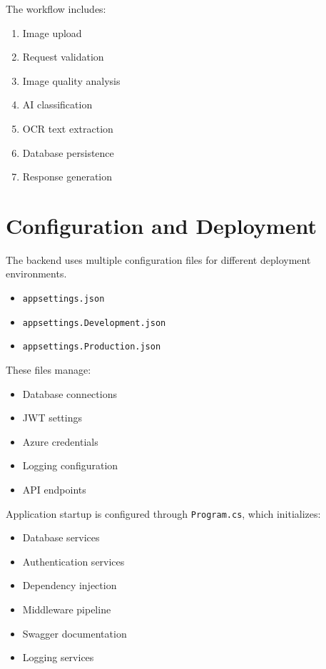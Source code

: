 The workflow includes:

\begin{enumerate}
    \item Image upload
    \item Request validation
    \item Image quality analysis
    \item AI classification
    \item OCR text extraction
    \item Database persistence
    \item Response generation
\end{enumerate}

\section{Configuration and Deployment}
\label{sec:configuration-deployment}

The backend uses multiple configuration files for different deployment environments.

\begin{itemize}
    \item \texttt{appsettings.json}
    \item \texttt{appsettings.Development.json}
    \item \texttt{appsettings.Production.json}
\end{itemize}

These files manage:

\begin{itemize}
    \item Database connections
    \item JWT settings
    \item Azure credentials
    \item Logging configuration
    \item API endpoints
\end{itemize}

Application startup is configured through \texttt{Program.cs}, which initializes:

\begin{itemize}
    \item Database services
    \item Authentication services
    \item Dependency injection
    \item Middleware pipeline
    \item Swagger documentation
    \item Logging services
\end{itemize}

